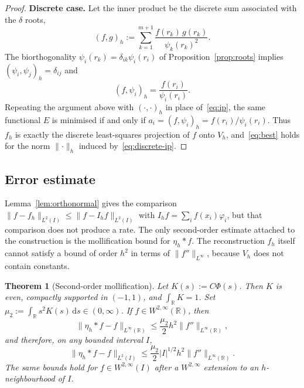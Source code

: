 \documentclass[final,3p,times]{elsarticle}
\theoremstyle{plain}
\newtheorem{theorem}{Theorem}
\theoremstyle{definition}
\theoremstyle{remark}
\newcommand{\dziti}{\ensuremath{\delta}\text{-Ziti}}
\newcommand{\dd}{\mathrm{d}}
\begin{document}
\begin{proof}
\textbf{Discrete case.}
Let the inner product be the discrete sum associated with the \dziti{} roots,
\begin{equation}
\label{eq:discrete-ip}
(f,g)_h
:=\sum_{k=1}^{m+1}\frac{f(r_k)\,g(r_k)}{\psi_k(r_k)^2}.
\end{equation}
The biorthogonality $\psi_i(r_k)=\delta_{ik}\psi_i(r_i)$ of
Proposition~\ref{prop:roots} implies
$(\psi_i,\psi_j)_h=\delta_{ij}$ and
\begin{equation}
(f,\psi_i)_h=\frac{f(r_i)}{\psi_i(r_i)}.
\end{equation}
Repeating the argument above with $(\cdot,\cdot)_h$ in place of~\eqref{eq:ip},
the same functional $E$ is minimised if and only if
$a_i=(f,\psi_i)_h=f(r_i)/\psi_i(r_i)$. Thus $f_h$ is exactly the discrete
least-squares projection of $f$ onto $V_h$, and~\eqref{eq:best} holds for the
norm $\lVert\cdot\rVert_h$ induced by~\eqref{eq:discrete-ip}.
\end{proof}

\subsection{Error estimate}

Lemma~\ref{lem:orthonormal} gives the comparison
$\lVert f-f_h\rVert_{L^2(I)}\le\lVert f-I_h f\rVert_{L^2(I)}$ with
$I_h f=\sum_i f(x_i)\varphi_i$, but that comparison does not produce a rate.
The only second-order estimate attached to the construction is the
mollification bound for $\eta_h*f$. The reconstruction $f_h$ itself cannot
satisfy a bound of order $h^2$ in terms of $\lVert f''\rVert_{L^\infty}$,
because $V_h$ does not contain constants.

\begin{theorem}[Second-order mollification]
\label{thm:mollify}
Let $K(s):=C\Phi(s)$. Then $K$ is even, compactly supported in $(-1,1)$, and
$\int_{\mathbb{R}}K=1$. Set
$\mu_2:=\int_{\mathbb{R}}s^2 K(s)\,\dd s\in(0,\infty)$.
If $f\in W^{2,\infty}(\mathbb{R})$, then
\begin{equation}
\label{eq:mollify-inf}
\lVert\eta_h*f-f\rVert_{L^\infty(\mathbb{R})}
\le
\frac{\mu_2}{2}h^2\lVert f''\rVert_{L^\infty(\mathbb{R})},
\end{equation}
and therefore, on any bounded interval $I$,
\begin{equation}
\label{eq:mollify-L2}
\lVert\eta_h*f-f\rVert_{L^2(I)}
\le
\frac{\mu_2}{2}\lvert I\rvert^{1/2}h^2\lVert f''\rVert_{L^\infty(\mathbb{R})}.
\end{equation}
The same bounds hold for $f\in W^{2,\infty}(I)$ after a $W^{2,\infty}$
extension to an $h$-neighbourhood of $I$.
\end{theorem}
\end{document}
